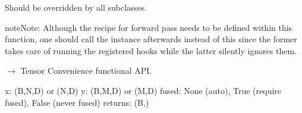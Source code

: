 \documentclass[letterpaper,10pt,english]{sphinxmanual}
\begin{document}
\begin{fulllineitems}
\begin{fulllineitems}
\sphinxAtStartPar
Should be overridden by all subclasses.

\begin{sphinxadmonition}{note}{Note:}
\sphinxAtStartPar
Although the recipe for forward pass needs to be defined within
this function, one should call the  instance afterwards
instead of this since the former takes care of running the
registered hooks while the latter silently ignores them.
\end{sphinxadmonition}

\end{fulllineitems}


\end{fulllineitems}


\begin{fulllineitems}
\label{\detokenize{dtw_loss_functions.soft_dtw_implementations.soft_dtw_cuda_ron:dtw_loss_functions.soft_dtw_implementations.soft_dtw_cuda_ron.softdtw}}
\pysigstartsignatures
\pysiglinewithargsret
{}
{\sphinxparamcomma {}\sphinxparamcomma {}\sphinxparamcomma {}\sphinxparamcomma {}\sphinxparamcomma {}\sphinxparamcomma {}\sphinxparamcomma {}}
{{ $\rightarrow$ Tensor}}
\pysigstopsignatures
\sphinxAtStartPar
Convenience functional API.

\sphinxAtStartPar
x: (B,N,D) or (N,D)
y: (B,M,D) or (M,D)
fused: None (auto), True (require fused), False (never fused)
returns: (B,)

\end{fulllineitems}
\end{document}
